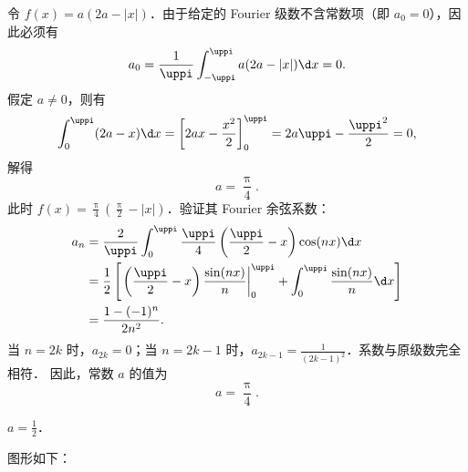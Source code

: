 \begin{solution}
    令 $f(x) = a(2a - |x|)$．由于给定的 Fourier 级数不含常数项（即 $a_0 = 0$），因此必须有
    \begin{equation}
        a_0 = \frac{1}{\uppi} \int_{-\uppi}^{\uppi} a(2a - |x|) \d x = 0.
    \end{equation}
    假定 $a \neq 0$，则有
    \begin{equation}
        \int_{0}^{\uppi} (2a - x) \d x = \left[ 2ax - \frac{x^2}{2} \right]_{0}^{\uppi} = 2a\uppi - \frac{\uppi^2}{2} = 0,
    \end{equation}
    解得
    \begin{equation}
        a = \frac{\uppi}{4}.
    \end{equation}
    此时 $f(x) = \frac{\uppi}{4} \left( \frac{\uppi}{2} - |x| \right)$．验证其 Fourier 余弦系数：
    \begin{equation}
        \begin{aligned}
            a_n & = \frac{2}{\uppi} \int_{0}^{\uppi} \frac{\uppi}{4} \left( \frac{\uppi}{2} - x \right) \cos(nx) \d x                                                      \\
                & = \frac{1}{2} \left[ \left. \left( \frac{\uppi}{2} - x \right) \frac{\sin(nx)}{n} \right|_{0}^{\uppi} + \int_{0}^{\uppi} \frac{\sin(nx)}{n} \d x \right] \\
                & = \frac{1 - (-1)^n}{2n^2}.
        \end{aligned}
    \end{equation}
    当 $n = 2k$ 时，$a_{2k} = 0$；当 $n = 2k-1$ 时，$a_{2k-1} = \frac{1}{(2k-1)^2}$．系数与原级数完全相符．
    因此，常数 $a$ 的值为
    \begin{equation}
        \boxed{a = \frac{\uppi}{4}}.
    \end{equation}

     $a = \frac{1}{2}$．

    图形如下：
    \begin{center}
\end{center}
\end{solution}
